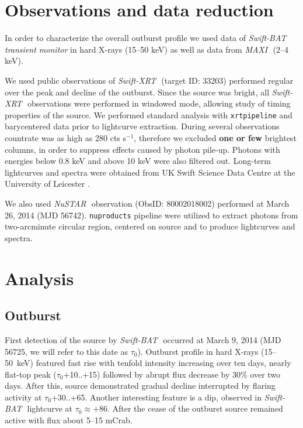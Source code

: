 \documentclass[a4paper,fleqn,usenatbib]{mnras}
\def\swiftx{{\em Swift-XRT\,}}
\def\swiftb{{\em Swift-BAT\,}}
\def\nustar{{\em NuSTAR\,}}
\def\maxi{{\em MAXI\,}}
\begin{document}
\section{Observations and data reduction}
\label{sec:datared} 
In order to characterize the overall outburst profile we used data of \swiftb\, {\it transient monitor} \citep{krimm13bat} in hard X-rays (15--50 keV) as well as data from \maxi\, \citep{matsuoka13maxi} (2--4 keV).

We used public observations of \swiftx\, (target ID: 33203) performed regular over the peak and decline of the outburst.  
Since the source was bright, all \swiftx\, observations were performed in windowed mode, allowing study of timing properties of the source. 
We performed standard analysis with {\texttt{xrtpipeline}} and barycentered data prior to lightcurve extraction. 
During several observations countrate was as high as 280 cts s$^{-1}$, therefore we excluded {\bf one or few} brightest columns, in order to suppress effects caused by photon pile-up. 
Photons with energies below 0.8 keV and above 10 keV were also filtered out. 
Long-term lightcurves and spectra were obtained from UK Swift Science Data Centre at the University of Leicester \citep{evans09}.

We also used \nustar\, observation (ObsID: 80002018002) performed at March 26, 2014 (MJD 56742). 
{\texttt{nuproducts}} pipeline were utilized to extract photons from two-arcminute circular region, centered on source and to produce lightcurves and spectra.

\section{Analysis}
\subsection{Outburst}
First detection of the source by \swiftb\, \citep{krimm14_atel} occurred at March 9, 2014 (MJD 56725, we will refer to this date as $\tau_{0}$). 
Outburst profile in hard X-rays (15--50~keV) featured fast rise with tenfold intensity increasing over ten days, nearly flat-top peak ($\tau_{0}$+10..+15) followed by abrupt flux decrease by 30\% over two days.
After this, source demonstrated gradual decline interrupted by flaring activity at $\tau_{0}$+30..+65. 
Another interesting feature is a dip, observed in \swiftb\, lightcurve at $\tau_{0} \approx +86$. 
After the cease of the outburst source remained active with flux about 5--15 mCrab. 
\end{document}
